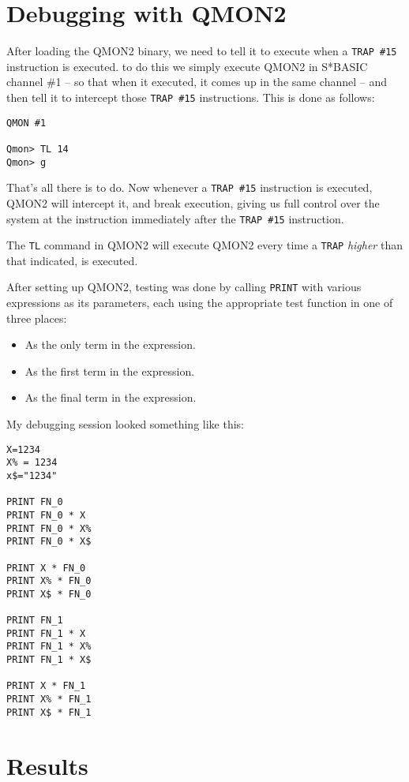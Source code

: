 \section{Debugging with QMON2}

After loading the QMON2 binary, we need to tell it to execute when
a \texttt{TRAP \#15} instruction is executed. to do this we simply
execute QMON2 in S{*}BASIC channel \#1 -- so that when it executed,
it comes up in the same channel -- and then tell it to intercept
those \texttt{TRAP \#15} instructions. This is done as follows:

\begin{lstlisting}[basicstyle={\ttfamily},showstringspaces=false,tabsize=4]
QMON #1

Qmon> TL 14
Qmon> g
\end{lstlisting}

That's all there is to do. Now whenever a \texttt{TRAP \#15} instruction
is executed, QMON2 will intercept it, and break execution, giving
us full control over the system at the instruction immediately after
the \texttt{TRAP \#15} instruction.

The \texttt{TL} command in QMON2 will execute QMON2 every time a \texttt{TRAP}
\emph{higher} than that indicated, is executed.

After setting up QMON2, testing was done by calling \texttt{PRINT}
with various expressions as its parameters, each using the appropriate
test function in one of three places:
\begin{itemize}
\item As the only term in the expression.
\item As the first term in the expression.
\item As the final term in the expression.
\end{itemize}
My debugging session looked something like this:

\begin{lstlisting}[basicstyle={\ttfamily},showstringspaces=false,tabsize=4]
X=1234
X% = 1234
x$="1234"

PRINT FN_0
PRINT FN_0 * X
PRINT FN_0 * X%
PRINT FN_0 * X$

PRINT X * FN_0
PRINT X% * FN_0
PRINT X$ * FN_0

PRINT FN_1
PRINT FN_1 * X
PRINT FN_1 * X%
PRINT FN_1 * X$

PRINT X * FN_1
PRINT X% * FN_1
PRINT X$ * FN_1
\end{lstlisting}


\section{Results}

